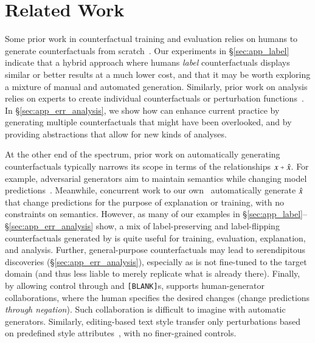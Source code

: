 \section{Related Work}
\label{sec:relate}

Some prior work in counterfactual training and evaluation relies on humans to generate counterfactuals from scratch~\cite{gardner2020contrast, teney2020learning, kaushik2019learning}. 
Our experiments in \S\ref{sec:app_label} indicate that a hybrid approach where humans \emph{label} \sysname{} counterfactuals displays similar or better results at a much lower cost, and that it may be worth exploring a mixture of manual and automated generation. 
Similarly, prior work on analysis relies on experts to create individual counterfactuals or perturbation functions~\cite{wu2019errudite, checklist:acl20}. 
In \S\ref{sec:app_err_analysis}, we show how \sysname{} can enhance current practice by generating multiple counterfactuals that might have been overlooked, and by providing abstractions that allow for new kinds of analyses.

At the other end of the spectrum, prior work on automatically generating counterfactuals typically narrows its scope in terms of the relationships $x \veryshortarrow \xp$.
For example, adversarial generators aim to maintain semantics while changing model predictions~\cite{ribeiro2018semantically, iyyer2018adversarial, alzantot-etal-2018-generating}.
Meanwhile, concurrent work to our own~\cite{madaan2020generate, ross2020explaining} automatically generate $\hat{x}$ that change predictions for the purpose of explanation or training, with no constraints on semantics.
However, as many of our examples in \S\ref{sec:app_label}--\S\ref{sec:app_err_analysis} show, a mix of label-preserving and label-flipping counterfactuals generated by \sysname is quite useful for training, evaluation, explanation, and analysis. 
Further, general-purpose counterfactuals may lead to serendipitous discoveries (\S\ref{sec:app_err_analysis}), especially as \sysname is not fine-tuned to the target domain (and thus less liable to merely replicate what is already there).
Finally, by allowing control through \tagstrs and \texttt{[BLANK]}s, \sysname{} supports human-generator collaborations, where the human specifies the desired changes (\eg change predictions \emph{through negation}).
Such collaboration is difficult to imagine with automatic generators.
Similarly, editing-based text style transfer only perturbations based on predefined style attributes~\cite{madaan-etal-2020-politeness, malmi-etal-2020-unsupervised}, with no finer-grained controls.


